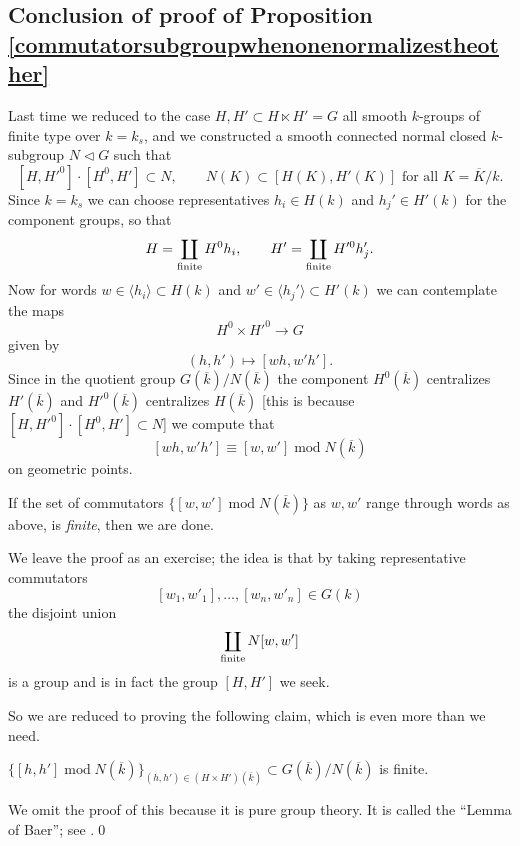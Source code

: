 \documentclass[10pt]{article}
\newcommand{\nsg}{\vartriangleleft}
\renewcommand{\(}{\left(}
\renewcommand{\)}{\right)}
\renewcommand{\bar}{\overline}
\renewcommand{\mod}{\operatorname{mod}}
\numberwithin{thm}{subsection}
\begin{document}
\subsection{Conclusion of proof of Proposition \ref{commutatorsubgroupwhenonenormalizestheother}}
Last time we reduced to the case $H,H'\subset H\ltimes H'=G$
all smooth $k$-groups of finite type
over $k=k_s$,
and we constructed a smooth connected normal closed $k$-subgroup $N\nsg G$
such that
\[[H,H'^0]\cdot[H^0,H']\subset N,\qquad N(K)\subset [H(K),H'(K)] \mbox{ for all } K=\bar K/k.\]
Since $k=k_s$ we can choose representatives $h_i\in H(k)$
and $h_j'\in H'(k)$ for the component groups,
so that
\[H=\coprod_{\rm{finite}}H^0h_i,\qquad H'=\coprod_{\rm{finite}}H'^0h_j'.\]
Now for words $w\in \langle h_i\rangle\subset H(k)$
and $w'\in \langle h_j'\rangle\subset H'(k)$ we can contemplate
the maps
\[H^0\times H'^0\to G\]
given by
\[(h,h')\mapsto [wh,w'h'].\]
Since in the quotient group $G(\bar k)/N(\bar k)$
the component $H^0(\bar k)$ centralizes $H'(\bar k)$
and $H'^0(\bar k)$ centralizes $H(\bar k)$
[this is because $[H,H'^0]\cdot[H^0,H']\subset N$]
we compute that
\[[wh,w'h']\equiv [w,w']\mod N(\bar k)\]
on geometric points.
\begin{lem}
If the set of commutators $\{[w,w']\mod N(\bar k)\}$ 
as $w,w'$ range through words as above, is \textit{finite},
then we are done.
\end{lem}
We leave the proof as an exercise; the idea is that 
by taking representative commutators $$[w_1,w'_1],\ldots, [w_n,w'_n]\in G(k)$$
the disjoint union
\[\coprod_{\rm{finite}}N[w,w']\]
is a group and is in fact the group $[H,H']$ we seek.

So we are reduced to proving the following claim, which is even more than we need.
\begin{claim}
$\{[h,h']\mod N(\bar k)\}_{(h,h')\in (H\times H')(\bar k)}\subset G(\bar k)/N(\bar k)$ is finite.
\end{claim}
We omit the proof of this because it is pure group theory.
It is called the ``Lemma of Baer''; see \cite[end of \S I.2]{borel}.\qed
\end{document}

